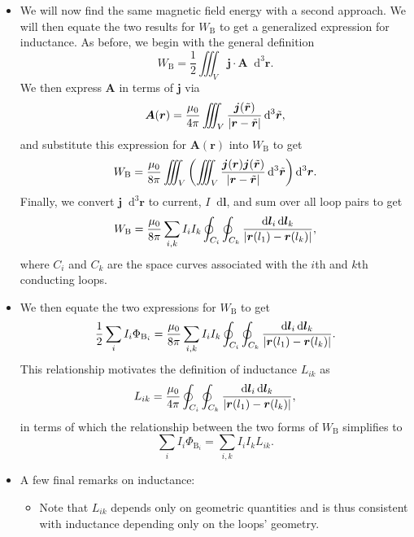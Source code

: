 \documentclass[11pt, a4paper]{article}
\newcommand{\diff}{\mathop{}\!\mathrm{d}} %
\newcommand{\dr}{\diff^{3} \r}  %
\newcommand{\dtr}{\diff^{3} \tilde{\r}}  %
\renewcommand{\vec}[1]{\bm{#1}} %
\renewcommand{\t}[1]{\tilde{#1}} %
\renewcommand{\r}{\vec{r}}
\newcommand{\A}{\vec{A}} %
\newcommand{\mm}{\mu_{0}}  %
\renewcommand{\j}{\vec{j}}  %
\begin{document}
\begin{itemize}
	\item We will now find the same magnetic field energy with a second approach. We will then equate the two results for $ W_{\text{B}} $ to get a generalized expression for inductance. As before, we begin with the general definition
	\begin{equation*}
		W_{\text{B}} = \frac{1}{2}\iiint_{V} \j \cdot \A \dr.
	\end{equation*}
	We then express $ \A $ in terms of $ \j $ via
	\begin{equation*}
		\A(\r) = \frac{\mm}{4\pi}\iiint_{V}\frac{\j(\t{\r})}{\abs{\r - \t{\r}}}\dtr,
	\end{equation*}
    and substitute this expression for $ \A(\r) $ into $ W_{\text{B}} $ to get
	\begin{equation*}
		W_{\text{B}} = \frac{\mm}{8\pi}\iiint_{V} \left(\iiint_{V}\frac{\j(\r)\j(\t{\r})}{\abs{\r - \t{\r}}}\dtr\right)\dr.
	\end{equation*}
	Finally, we convert $ \j \dr $ to current, $ I \diff \vec{l} $, and sum over all loop pairs to get
	\begin{equation*}
		W_{\text{B}} = \frac{\mm}{8\pi}\sum_{i, k}I_{i}I_{k}\oint_{C_{i}}\oint_{C_{k}}\frac{\diff \vec{l}_{i}\diff \vec{l}_{k}}{\abs{\r(l_{1}) - \r(l_{k})}},
	\end{equation*}
	where $ C_{i} $ and $ C_{k} $ are the space curves associated with the $ i $th and $ k $th conducting loops.
	
	\item We then equate the two expressions for $ W_{\text{B}} $ to get
	\begin{equation*}
		\frac{1}{2}\sum_{i}I_{i}\Phi_{\text{B}_{i}} = \frac{\mm}{8\pi}\sum_{i, k}I_{i}I_{k}\oint_{C_{i}}\oint_{C_{k}}\frac{\diff \vec{l}_{i}\diff \vec{l}_{k}}{\abs{\r(l_{1}) - \r(l_{k})}}.
	\end{equation*}
    This relationship motivates the definition of inductance $ L_{ik} $ as
	\begin{equation*}
		L_{ik} = \frac{\mm}{4\pi}\oint_{C_{i}}\oint_{C_{k}}\frac{\diff \vec{l}_{i}\diff \vec{l}_{k}}{\abs{\r(l_{1}) - \r(l_{k})}},
	\end{equation*}
    in terms of which the relationship between the two forms of $ W_{\text{B}} $ simplifies to
	\begin{equation*}
		\sum_{i}I_{i}\Phi_{\text{B}_{i}} = \sum_{i, k}I_{i}I_{k} L_{ik}.
	\end{equation*}
	
	\item A few final remarks on inductance:
    \begin{itemize}
        \item Note that $ L_{ik} $ depends only on geometric quantities and is thus consistent with inductance depending only on the loops' geometry.


\end{itemize}
\end{itemize}
\end{document}
